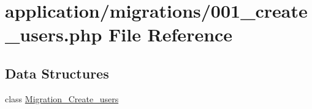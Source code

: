 \hypertarget{001__create__users_8php}{\section{application/migrations/001\-\_\-create\-\_\-users.php File Reference}
\label{001__create__users_8php}
}
\subsection*{Data Structures}
\begin{DoxyCompactItemize}
\item 
class \hyperlink{class_migration___create__users}{Migration\-\_\-\-Create\-\_\-users}
\end{DoxyCompactItemize}

